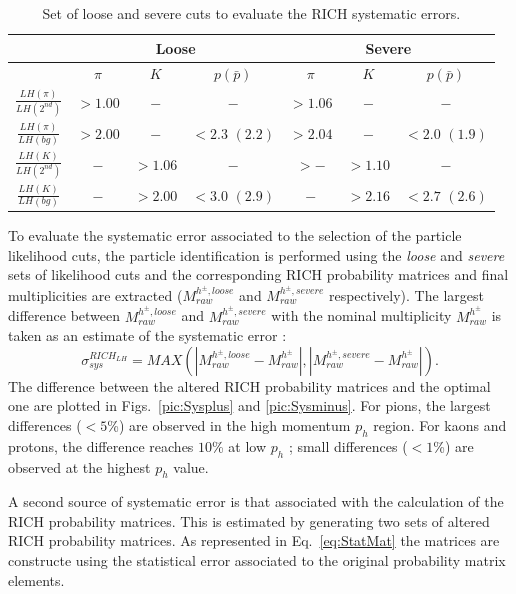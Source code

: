 \begin{table}[!h]
	\centering
	\begin{tabular}{ccccccc}
		\hline
		 & \multicolumn{3}{c}{Loose} & \multicolumn{3}{c}{Severe} \\
		\hline
		 & $\pi$ & $K$ & $p(\bar{p})$ & $\pi$ & $K$ & $p(\bar{p})$ \\
		\hline
		$\frac{LH(\pi)}{LH(2^{nd})}$ & $> 1.00$ & $-$ & $-$ & $>1.06$ & $-$ & $-$ \\
		$\frac{LH(\pi)}{LH(bg)}$ & $> 2.00$ & $-$ & $<2.3$ $(2.2)$ & $>2.04$ & $-$ & $<2.0$ $(1.9)$ \\
		$\frac{LH(K)}{LH(2^{nd})}$ & $-$ & $>1.06$ & $-$ & $>-$ & $>1.10$ & $-$ \\
		$\frac{LH(K)}{LH(bg)}$ & $-$ & $>2.00$ & $<3.0$ $(2.9)$ & $-$ & $>2.16$ & $<2.7$ $(2.6)$ \\
		\hline
	\end{tabular}
  \caption{Set of loose and severe cuts to evaluate the RICH systematic errors.}
  \label{tab:loose.severe}
\end{table}

To evaluate the systematic error associated to the selection of the particle likelihood cuts, the particle identification is performed using the \textit{loose}
and \textit{severe} sets of likelihood cuts and the corresponding RICH probability matrices and final multiplicities are extracted ($M^{h^{\pm},loose}_{raw}$
and $M^{h^{\pm},severe}_{raw}$ respectively). The largest difference between $M^{h^{\pm},loose}_{raw}$ and $M^{h^{\pm},severe}_{raw}$ with the nominal
multiplicity $M^{h^{\pm}}_{raw}$ is taken as an estimate of the systematic error :
%
\begin{equation}
  \sigma^{RICH_{LH}}_{sys} = MAX(|M^{h^{\pm},loose}_{raw}-M^{h^{\pm}}_{raw}|,|M^{h^{\pm},severe}_{raw}-M^{h^{\pm}}_{raw}|).
\end{equation}
%
The difference between the altered RICH probability matrices and the optimal one are plotted in Figs.~\ref{pic:Sysplus} and \ref{pic:Sysminus}. For pions, the largest differences
($<5$\%) are observed in the high momentum $p_h$ region. For kaons and protons, the difference reaches $10$\% at low $p_h$ ; small differences ($<1$\%) are observed at the
highest $p_h$ value.

A second source of systematic error is that associated with the calculation of the RICH probability matrices. This is estimated by generating two sets of altered
RICH probability matrices. As represented in Eq.~\ref{eq:StatMat} the matrices are constructe using the statistical error associated to the original probability matrix elements.

